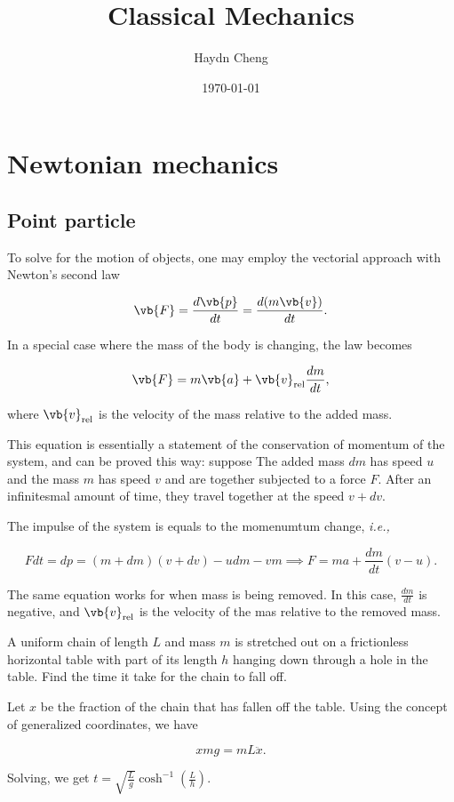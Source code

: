 \documentclass[a4paper,12pt]{report}
\title{Classical Mechanics}
\author{Haydn Cheng}
\date{\today}
\begin{document}
\maketitle
\tableofcontents
	
\chapter{Newtonian mechanics}
\section{Point particle}

To solve for the motion of objects, one may employ the vectorial approach with Newton's second law

\begin{equation}
	\vb{F} = \frac{d\vb{p} }{dt}  = \frac{d (m\vb{v}) }{d t} . \label{new2} 
\end{equation}

In a special case where the mass of the body is changing, the law becomes

\begin{equation}
	\vb{F} = m\vb{a} + \vb{v} _{\text{rel} } \frac{dm}{dt},  \label{new2prime} 
\end{equation}

where \(\vb{v} _{\text{rel} } \) is the velocity of the mass relative to the added mass.

This equation is essentially a statement of the conservation of momentum of the system, and can be proved this way: suppose The added mass \(dm\) has speed \(u\) and the mass \(m\) has speed \(v\) and are together subjected to a force \(F\). After an infinitesmal amount of time, they travel together at the speed \(v+dv\).

The impulse of the system is equals to the momenumtum change, \textit{i.e.,} 

\begin{equation}
	Fdt= dp = (m+dm)(v+dv)-udm-vm \implies F = ma+\frac{dm}{dt}(v-u).  
\end{equation}

The same equation works for when mass is being removed. In this case, \(\frac{dm}{dt} \) is negative, and \(\vb{v} _{\text{rel} } \) is the velocity of the mas relative to the removed mass.


{A uniform chain of length \(L\) and mass \(m\) is stretched out on a frictionless horizontal table with part of its length \(h\) hanging down through a hole in the table. Find the time it take for the chain to fall off.}
{Let \(x\) be the fraction of the chain that has fallen off the table. Using the concept of generalized coordinates, we have 

\begin{equation}
	xmg = mL \ddot{x}. 
\end{equation}

Solving, we get \(t = \sqrt{\frac{L}{g} } \cosh^{-1} \left( \frac{L}{h}  \right) \).
} 
\end{document}
